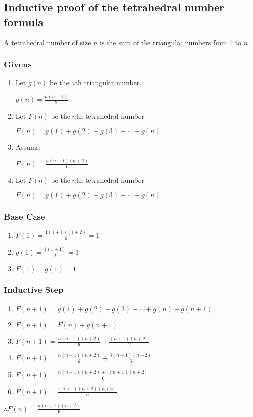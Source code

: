 \documentclass{article}
\begin{document}
\subsection*{Inductive proof of the tetrahedral number formula}
A tetrahedral number of size $n$ is the sum of the triangular numbers from 1 to $n$.

\subsubsection*{Givens}

\begin{enumerate}
	\item Let $g(n)$ be the $n$th triangular number.

		$g(n) = \frac{n(n+1)}{2}$
	\item Let $F(n)$ be the $n$th tetrahedral number.
	
		$F(n) = g(1) + g(2) + g(3) + \cdots + g(n)$
	\item Assume:
	
		$F(n) = \frac{n(n+1)(n+2)}{6}$
		
	\item Let $F(n)$ be the $n$th tetrahedral number.
	
		$F(n) = g(1) + g(2) + g(3) + \cdots + g(n)$
	

\end{enumerate}

\subsubsection*{Base Case}

\begin{enumerate}
	
	\item $F(1) = \frac{1(1+1)(1+2)}{6} = 1$
	\item $g(1) = \frac{1(1+1)}{2} = 1$
	\item $F(1) = g(1) = 1$

\end{enumerate}

\subsubsection*{Inductive Step}

\begin{enumerate}
	
	\item $F(n + 1) =  g(1) + g(2) + g(3) + \cdots + g(n) + g(n+1)$
	\item $F(n + 1) =  F(n) + g(n+1)$
	\item $F(n + 1) =   \frac{n(n+1)(n+2)}{6} + \frac{(n+1)(n+2)}{2}$
	\item $F(n + 1) =   \frac{n(n+1)(n+2)}{6} + \frac{3(n+1)(n+2)}{6}$
	\item $F(n + 1) =   \frac{n(n+1)(n+2) + 3(n+1)(n+2)}{6}$
	\item $F(n + 1) =   \frac{(n+1)(n+2) (n+3)}{6}$

\end{enumerate}

\begin{center}$\therefore F(n) = \frac{n(n+1)(n+2)}{6}$ \end{center}
\end{document}

